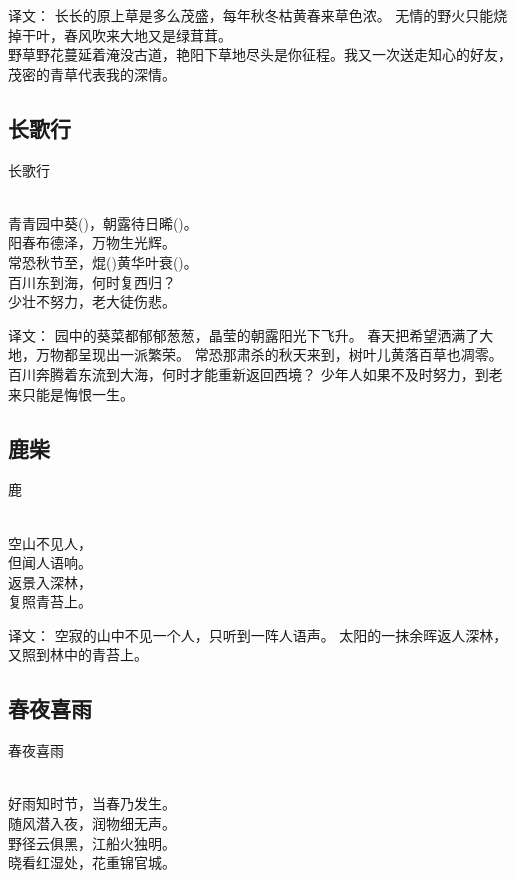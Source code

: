 译文：
长长的原上草是多么茂盛，每年秋冬枯黄春来草色浓。
无情的野火只能烧掉干叶，春风吹来大地又是绿茸茸。\\

野草野花蔓延着淹没古道，艳阳下草地尽头是你征程。我又一次送走知心的好友，茂密的青草代表我的深情。

\subsection{长歌行}

\noindent 长歌行

  \\

\noindent 青青园中葵()，朝露待日晞()。\\
阳春布德泽，万物生光辉。\\
常恐秋节至，焜()黄华叶衰()。\\
百川东到海，何时复西归？\\
少壮不努力，老大徒伤悲。

译文：
园中的葵菜都郁郁葱葱，晶莹的朝露阳光下飞升。
春天把希望洒满了大地，万物都呈现出一派繁荣。
常恐那肃杀的秋天来到，树叶儿黄落百草也凋零。
百川奔腾着东流到大海，何时才能重新返回西境？
少年人如果不及时努力，到老来只能是悔恨一生。

\subsection{鹿柴}

\noindent 鹿

  \\

\noindent 空山不见人，\\但闻人语响。\\
返景入深林，\\复照青苔上。

译文：
空寂的山中不见一个人，只听到一阵人语声。
太阳的一抹余晖返人深林，又照到林中的青苔上。

\subsection{春夜喜雨}

\noindent 春夜喜雨

  \\

\noindent 好雨知时节，当春乃发生。\\
随风潜入夜，润物细无声。\\
野径云俱黑，江船火独明。\\
晓看红湿处，花重锦官城。

